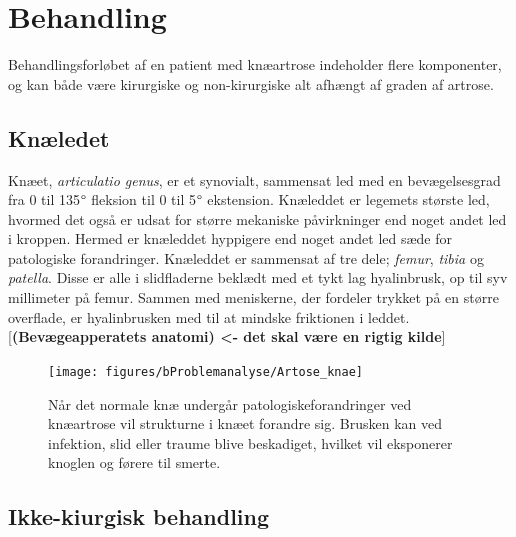 \section{Behandling}
Behandlingsforløbet af en patient med knæartrose indeholder flere komponenter, og kan både være kirurgiske og non-kirurgiske alt afhængt af graden af artrose.
\subsection*{Knæledet}
Knæet, \textit{articulatio genus}, er et synovialt, sammensat led med en bevægelsesgrad fra 0 til 135$\degree$ fleksion til 0 til 5$\degree$ ekstension. Knæleddet er legemets største led, hvormed det også er udsat for større mekaniske påvirkninger end noget andet led i kroppen. Hermed er knæleddet hyppigere end noget andet led sæde for patologiske forandringer. Knæleddet er sammensat af tre dele; \textit{femur}, \textit{tibia} og \textit{patella}. Disse er alle i slidfladerne beklædt med et tykt lag hyalinbrusk, op til syv millimeter på femur. Sammen med meniskerne, der fordeler trykket på en større overflade, er hyalinbrusken med til at mindske friktionen i leddet. [\textbf{(Bevægeapperatets anatomi) <- det skal være en rigtig kilde}]

\begin{figure}[H] 
\begin{center}
\texttt{[image: figures/bProblemanalyse/Artose\_knae]}
\end{center}
\caption{Når det normale knæ undergår patologiskeforandringer ved knæartrose vil strukturne i knæet forandre sig. Brusken kan ved infektion, slid eller traume blive beskadiget, hvilket vil eksponerer knoglen og førere til smerte.\citep{schroder} \citep{adobe}} 
\label{fig:tka_implant} 
\end{figure}

\subsection{Ikke-kiurgisk behandling}

